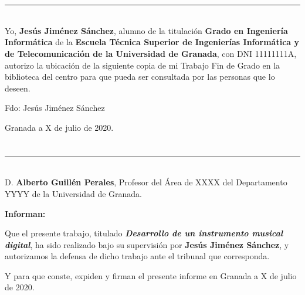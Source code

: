 \chapter*{}   %

\thispagestyle{empty}

\noindent\rule[-1ex]{\textwidth}{2pt}\\[4.5ex]

Yo, \textbf{Jesús Jiménez Sánchez}, alumno de la titulación \textbf{Grado en Ingeniería Informática} de la
\textbf{Escuela Técnica Superior de Ingenierías Informática y de Telecomunicación de la Universidad de Granada}, con DNI
11111111A, autorizo la ubicación de la siguiente copia de mi Trabajo Fin de Grado en la biblioteca del centro para que
pueda ser consultada por las personas que lo deseen.

\vspace{6cm}

\noindent Fdo: Jesús Jiménez Sánchez

\vspace{2cm}

\begin{flushright}
    Granada a X de julio de 2020.
\end{flushright}

\chapter*{}   %
\thispagestyle{empty}

\noindent\rule[-1ex]{\textwidth}{2pt}\\[4.5ex]

D. \textbf{Alberto Guillén Perales}, Profesor del Área de XXXX del Departamento YYYY de la Universidad de
Granada.

\vspace{0.5cm}

\textbf{Informan:}

\vspace{0.5cm}

Que el presente trabajo, titulado \textit{\textbf{Desarrollo de un instrumento musical digital}},
ha sido realizado bajo su supervisión por \textbf{Jesús Jiménez Sánchez}, y autorizamos la defensa de
dicho trabajo ante el tribunal
que corresponda.

\vspace{0.5cm}

Y para que conste, expiden y firman el presente informe en Granada a X de julio de 2020.

